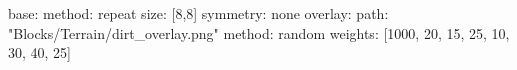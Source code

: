 base:
  method: repeat
  size: [8,8]
  symmetry: none
overlay:
  path: "Blocks/Terrain/dirt_overlay.png"
  method: random
  weights: [1000, 20, 15, 25, 10, 30, 40, 25]
